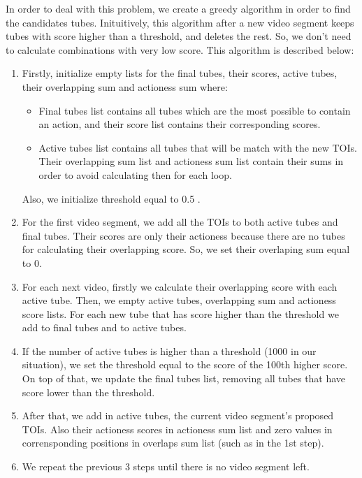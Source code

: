 \documentclass{report}
\begin{document}
In order to deal with this problem, we create a greedy algorithm in order to find the candidates tubes. Inituitively, this algorithm after
a new video segment keeps tubes with score higher than a threshold, and deletes the rest.
So, we don't need to calculate combinations with very low score. This algorithm is described below:
\begin{enumerate}
\item Firstly, initialize empty lists for the final tubes, their scores, active tubes, their overlapping sum and actioness sum where:
  \begin{itemize}
  \item Final tubes list contains all tubes which are the most possible to contain an action, and their score list contains their
    corresponding scores.
  \item Active tubes list contains all tubes that will be match with the new TOIs. Their overlapping sum list and actioness sum list
    contain their sums in order to avoid calculating then for each loop. 
  \end{itemize}
Also, we initialize threshold equal to 0.5 .
\item For the first video segment, we add all the TOIs to both active tubes and final tubes. Their scores are only their actioness because
  there are no tubes for calculating their overlapping score. So, we set their overlaping sum equal to 0.
\item For each next video, firstly we calculate their overlapping score with each active tube. Then, we empty active tubes, overlapping
  sum and actioness score lists.  For each new tube that has score higher than the threshold we add to final tubes and to active tubes.
\item If the number of active tubes is higher than a threshold (1000 in our situation), we set the threshold equal to the score of
  the 100th higher score. On top of that, we update the final tubes list, removing all tubes that have score lower than the threshold.
\item After that, we add in active tubes, the current video segment's proposed TOIs. Also their actioness scores in actioness sum list and
  zero values in corrensponding positions in overlaps sum list (such as in the 1st step).
\item We repeat the previous 3 steps until there is no video segment left.
\end{enumerate}
\end{document}
